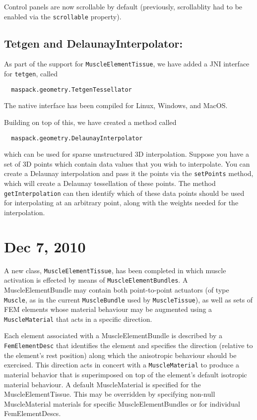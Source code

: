 \documentclass{article}
\begin{document}
Control panels are now scrollable by default (previously, scrollablity
had to be enabled via the {\tt scrollable} property).

\subsection*{Tetgen and DelaunayInterpolator:}

As part of the support for {\tt MuscleElementTissue}, we have added a JNI
interface for {\tt tetgen}, called 

\begin{verbatim}
  maspack.geometry.TetgenTessellator
\end{verbatim}

The native interface has been compiled for Linux, Windows, and MacOS.

Building on top of this, we have created a method called

\begin{verbatim}
  maspack.geometry.DelaunayInterpolator
\end{verbatim}

which can be used for sparse unstructured 3D interpolation. Suppose
you have a set of 3D points which contain data values that you wish to
interpolate. You can create a Delaunay interpolation and pass it the
points via the {\tt setPoints} method, which will create a Delaunay
tessellation of these points.  The method {\tt getInterpolation} can then
identify which of these data points should be used for interpolating
at an arbitrary point, along with the weights needed for the
interpolation.

\section*{Dec 7, 2010}

A new class, {\tt MuscleElementTissue}, has been completed in which muscle
activation is effected by means of {\tt MuscleElement\-Bundles}. A
MuscleElementBundle may contain both point-to-point actuators (of type
{\tt Muscle}, as in the current {\tt MuscleBundle} used by {\tt MuscleTissue}), as
well as sets of FEM elements whose material behaviour may be augmented
using a {\tt MuscleMaterial} that acts in a specific direction.

Each element associated with a MuscleElementBundle is described by a
{\tt FemElementDesc} that identifies the element and specifies the
direction (relative to the element's rest position) along which the
anisotropic behaviour should be exercised. This direction acts in
concert with a {\tt MuscleMaterial} to produce a material behavior that is
superimposed on top of the element's default isotropic material
behaviour. A default MuscleMaterial is specified for the
MuscleElementTissue. This may be overridden by specifying non-null
MuscleMaterial materials for specific MuscleElementBundles or for
individual FemElementDescs.
\end{document}
